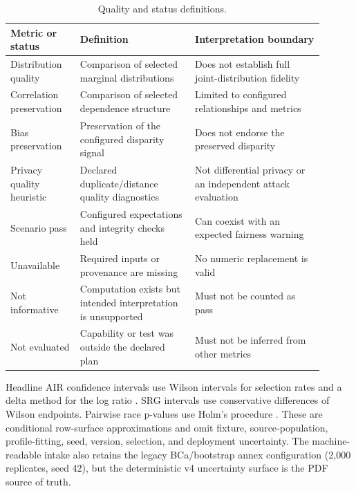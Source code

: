 \begin{table}[htbp]
\centering
\footnotesize
\AccessibleTableHeaderRow
\begin{tabular}{@{}>{\RaggedRight\arraybackslash}p{0.20\linewidth}
                    >{\RaggedRight\arraybackslash}p{0.33\linewidth}
                    >{\RaggedRight\arraybackslash}p{0.37\linewidth}@{}}
\toprule
Metric or status & Definition & Interpretation boundary \\
\midrule
Distribution quality & Comparison of selected marginal distributions & Does not establish full joint-distribution fidelity \\
Correlation preservation & Comparison of selected dependence structure & Limited to configured relationships and metrics \\
Bias preservation & Preservation of the configured disparity signal & Does not endorse the preserved disparity \\
Privacy quality heuristic & Declared duplicate/distance quality diagnostics & Not differential privacy or an independent attack evaluation \\
Scenario pass & Configured expectations and integrity checks held & Can coexist with an expected fairness warning \\
Unavailable & Required inputs or provenance are missing & No numeric replacement is valid \\
Not informative & Computation exists but intended interpretation is unsupported & Must not be counted as pass \\
Not evaluated & Capability or test was outside the declared plan & Must not be inferred from other metrics \\
\bottomrule
\end{tabular}
\caption{Quality and status definitions.}
\label{tab:status-definitions}
\end{table}

Headline AIR confidence intervals use Wilson intervals for selection rates and a delta method for
the log ratio \citep{wilson1927probable,oehlert1992delta}. SRG intervals use conservative
differences of Wilson endpoints. Pairwise race p-values use Holm's procedure
\citep{holm1979sequential}. These are conditional row-surface approximations and omit fixture,
source-population, profile-fitting, seed, version, selection, and deployment uncertainty. The
machine-readable intake also retains the legacy BCa/bootstrap annex configuration (2,000
replicates, seed 42), but the deterministic v4 uncertainty surface is the PDF source of truth.
